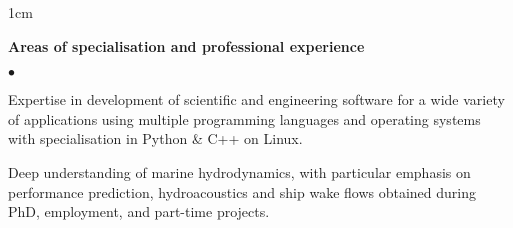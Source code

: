 \documentclass[a4paper,10pt]{article}
\newcommand{\squishlist}{
	\begin{list}{$\bullet$}
	{
		\setlength{\itemsep}{0pt}
		\setlength{\parsep}{0pt}
		\setlength{\topsep}{0pt}
		\setlength{\partopsep}{0pt}
		\setlength{\leftmargin}{2em}
		\setlength{\labelwidth}{1.5em}
		\setlength{\labelsep}{0.5em}
	}
}
\newcommand{\squishend}{\end{list}}
\begin{document}
\begin{minipage}{\textwidth}
\begin{adjustwidth}{}{1cm}

\textbf{Areas of specialisation and professional experience}
\squishlist
	\item Expertise in development of scientific and engineering software for a wide variety
		of applications using multiple programming languages and operating systems with
		specialisation in Python \& C++ on Linux.
	\item Deep understanding of marine hydrodynamics, with particular emphasis on
		performance prediction, hydroacoustics and ship wake flows obtained during PhD, employment, and part-time projects.
\squishend


\end{adjustwidth}
\end{minipage}
\end{document}
